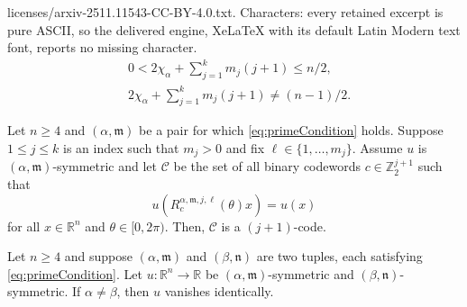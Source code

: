 \documentclass[10pt,a4paper]{amsart}
\newcommand{\C}{\mathcal{C}}
\newcommand{\RR}{\mathbb{R}}
\newcommand{\ZZ}{\mathbb{Z}}
\newcommand{\m}{\mathfrak{m}}
\newcommand{\n}{\mathfrak{n}}
\begin{document}
licenses/arxiv-2511.11543-CC-BY-4.0.txt. Characters: every retained excerpt is pure ASCII, so the delivered engine, XeLaTeX with its default Latin Modern text font, reports no missing character.
	\begin{align}
		&0 < 2\chi_\alpha  + \textstyle\sum_{j=1}^k m_j(j+1) \le n/2,\label{eq:primeCondition}\\
		&\textstyle 2\chi_\alpha + \sum_{j=1}^k m_j(j+1) \ne (n-1)/2.\label{eq:primeCondition2}
	\end{align}

	\begin{lem}\label{lem:isCode}
		Let $n \ge 4$ and $(\alpha,\m)$ be a pair for which \eqref{eq:primeCondition} holds. Suppose $1 \le j \le k$ is an index such that $m_j >0$ and fix $\ell \in \{1,\dots, m_j\}$. Assume $u$ is $(\alpha,\m)$-symmetric and let $\C$ be the set of all binary codewords $c \in \ZZ_2^{j+1}$ such that
		\[
		u(R_c^{\alpha,\m, j,\ell}(\theta)x) = u(x)
		\]
		for all $x \in \RR^n$ and $\theta \in [0,2\pi)$. Then, $\C$ is a $(j+1)$-code.
	\end{lem}

	\begin{prop}\label{prop:distinct2}
		Let $n \ge 4$ and suppose $(\alpha, \m)$ and $(\beta, \n)$ are two tuples, each satisfying \eqref{eq:primeCondition}. Let $u : \RR^n \to \RR$ be $(\alpha,\m)$-symmetric and $(\beta,\n)$-symmetric. If $\alpha \ne \beta$, then $u$ vanishes identically.
	\end{prop}
\end{document}
